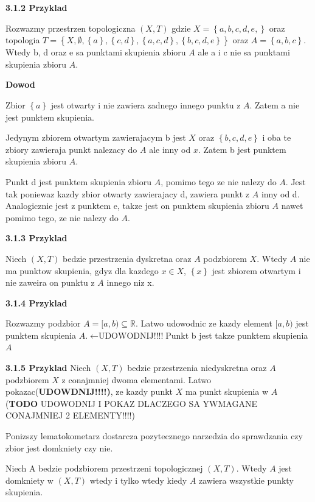 \documentclass{article}
\begin{document}
\textbf{3.1.2 Przyklad}

Rozwazmy przestrzen topologiczna $(X,T)$ gdzie $X = \left\{ a,b,c,d,e, \right\}$ oraz topologia $T = \left\{X, \emptyset, \left\{ a \right\}, \left\{ c, d \right\}, \left\{ a,c,d \right\}, \left\{ b,c,d,e \right\}  \right\}$ oraz $A = \left\{ a,b,c \right\}$. Wtedy b, d oraz e sa punktami skupienia zbioru $A$ ale a i c nie sa punktami skupienia zbioru $A$.

\textbf{Dowod}

Zbior $\left\{ a \right\}$ jest otwarty i nie zawiera zadnego innego punktu z $A$. Zatem a nie jest punktem skupienia.

Jedynym zbiorem otwartym zawierajacym b jest $X$ oraz $\left\{ b,c,d,e \right\}$ i oba te zbiory zawieraja punkt nalezacy do $A$ ale inny od $x$. Zatem b jest punktem skupienia zbioru $A$.

Punkt d jest punktem skupienia zbioru $A$, pomimo tego ze nie nalezy do $A$. Jest tak poniewaz kazdy zbior otwarty zawierajacy d, zawiera punkt z $A$ inny od d. Analogicznie jest z punktem e, takze jest on punktem skupienia zbioru $A$ nawet pomimo tego, ze nie nalezy do $A$.


\textbf{3.1.3 Przyklad}

Niech $(X, T)$ bedzie przestrzenia dyskretna oraz $A$ podzbiorem $X$. Wtedy $A$ nie ma punktow skupienia, gdyz dla kazdego $x \in X$, $\left\{ x \right\}$ jest zbiorem otwartym i nie zaweira on punktu z $A$ innego niz x.

\textbf{3.1.4 Przyklad}

Rozwazmy podzbior $A = [a,b) \subseteq \mathbb{R}$. Latwo udowodnic ze kazdy element $[a,b)$ jest punktem skupienia $A$.$\leftarrow \text{UDOWODNIJ!!!!} $Punkt b jest takze punktem skupienia $A$  

\textbf{3.1.5 Przyklad}
Niech $(X,T)$ bedzie przestrzenia niedyskretna oraz $A$ podzbiorem $X$ z conajmniej dwoma elementami. Latwo pokazac(\textbf{UDOWDNIJ!!!!)}, ze kazdy punkt $X$ ma punkt skupienia w $A$ (\textbf{TODO} UDOWODNIJ I POKAZ DLACZEGO SA YWMAGANE CONAJMNIEJ 2 ELEMENTY!!!!)

Ponizszy lematokometarz dostarcza pozytecznego narzedzia do sprawdzania czy zbior jest domkniety czy nie.

\begin{tcolorbox}[colback=white!90!green,colframe=black!35!green,title=3.1.6 Lematokomentarz: Warunek na domknietosc A]

    Niech A bedzie podzbiorem przestrzeni topologicznej $(X,T)$. Wtedy $A$ jest domkniety w $(X,T)$ wtedy i tylko wtedy kiedy $A$ zawiera wszystkie punkty skupienia.

\end{tcolorbox}
\end{document}
